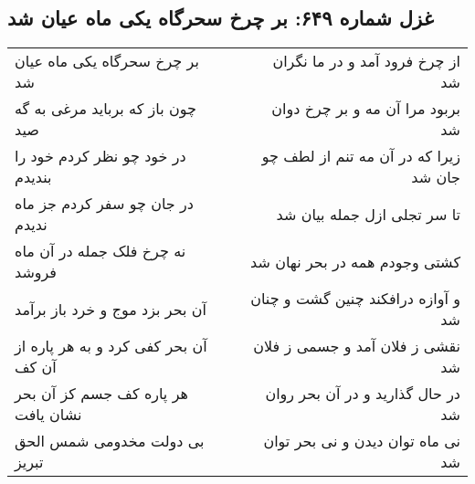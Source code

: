 \begin{center}
\section*{غزل شماره ۶۴۹: بر چرخ سحرگاه یکی ماه عیان شد}
\label{sec:0649}
\begin{longtable}{l p{0.5cm} r}
بر چرخ سحرگاه یکی ماه عیان شد
&&
از چرخ فرود آمد و در ما نگران شد
\\
چون باز که برباید مرغی به گه صید
&&
بربود مرا آن مه و بر چرخ دوان شد
\\
در خود چو نظر کردم خود را بندیدم
&&
زیرا که در آن مه تنم از لطف چو جان شد
\\
در جان چو سفر کردم جز ماه ندیدم
&&
تا سر تجلی ازل جمله بیان شد
\\
نه چرخ فلک جمله در آن ماه فروشد
&&
کشتی وجودم همه در بحر نهان شد
\\
آن بحر بزد موج و خرد باز برآمد
&&
و آوازه درافکند چنین گشت و چنان شد
\\
آن بحر کفی کرد و به هر پاره از آن کف
&&
نقشی ز فلان آمد و جسمی ز فلان شد
\\
هر پاره کف جسم کز آن بحر نشان یافت
&&
در حال گذارید و در آن بحر روان شد
\\
بی دولت مخدومی شمس الحق تبریز
&&
نی ماه توان دیدن و نی بحر توان شد
\\
\end{longtable}
\end{center}
